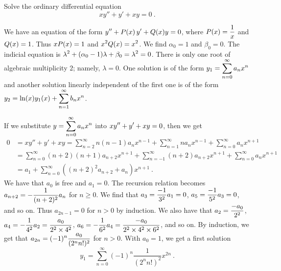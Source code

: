 \begin{egg}
Solve the ordinary differential equation
\[
xy''+  y' + x y = 0 \ .
\]

We have an equation of the form
$\displaystyle y'' + P(x)\, y' + Q(x) y = 0$, where
$\displaystyle P(x) = \frac{1}{x}$ and
$\displaystyle Q(x) = 1$.
Thus $\displaystyle x P(x) = 1$ and
$\displaystyle x^2 Q(x) = x^2$.  We find
$\alpha_0 = 1$ and $\beta_0= 0$.  The indicial equation is
$\displaystyle \lambda^2 + (\alpha_0 - 1)\lambda + \beta_0 = \lambda^2 = 0$.
There is only one root of algebraic multiplicity $2$; namely, $\lambda=0$.
One solution is of the form
$\displaystyle y_1 = \sum_{n=0}^\infty a_n x^n$ and another solution
linearly independent of the first one is of the form
$\displaystyle y_2 = \ln(x) y_1(x) + \sum_{n=1}^\infty b_n x^n$.

If we substitute $\displaystyle y = \sum_{n=0}^\infty a_n x^n$ into
$\displaystyle xy''+ y' + xy = 0$, then we get
\begin{align*}
0 & = xy''+ y' + xy
= \sum_{n=2}^\infty n(n-1) a_n x^{n-1}
+ \sum_{n=1}^\infty n a_n x^{n-1} + \sum_{n=0}^\infty a_n x^{n+1} \\
&= \sum_{n=0}^\infty (n+2)(n+1) a_{n+2} x^{n+1}
+ \sum_{n=-1}^\infty (n+2)a_{n+2} x^{n+1}
+ \sum_{n=0}^\infty a_n x^{n+1} \\
&= a_1 + \sum_{n=0}^\infty \left( (n+2)^2 a_{n+2} +a_n\right) x^{n+1} \  .
\end{align*}
We have that $a_0$ is free and $a_1=0$.  The recursion relation becomes
$\displaystyle a_{n+2} = -\frac{1}{(n+2)^2} a_n$
for $n \geq 0$.  We find that
$\displaystyle a_3 = \frac{-1}{3^2} a_1 = 0$,
$\displaystyle a_5 = \frac{-1}{5^2} a_3 = 0$, and so on.
Thus $a_{2n-1} = 0 $ for $n>0$ by induction.  We also have that
$\displaystyle a_2 = \frac{-a_0}{2^2}$,
$\displaystyle a_4 = -\frac{1}{4^2}a_2 = \frac{a_0}{2^2\times 4^2}$,
$\displaystyle a_6 = -\frac{1}{6^2}a_4
= \frac{-a_0}{2^2\times 4^2\times 6^2}$, and so on.
By induction, we get that
$\displaystyle a_{2n} = (-1)^n \frac{a_0}{(2^n n!)^2}$
for $n>0$.   With $a_0=1$, we get a first solution
\[
y_1 = \sum_{n=0}^\infty (-1)^n \frac{1}{ (2^n n!)^2}x^{2n} \ .
\]


\end{egg}
